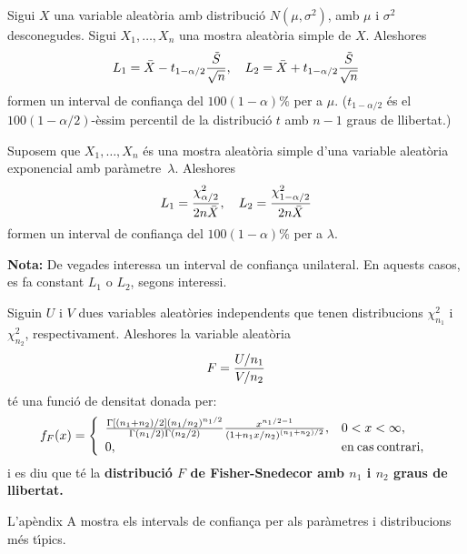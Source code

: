 \begin{proposition}
Sigui $X$ una variable aleat\`oria amb distribuci\'o
$N(\mu,\sigma^2)$, amb $\mu$ i $\sigma^2$ desconegudes. 
Sigui $X_1, \ldots , X_n$ una mostra aleat\`oria simple de $X$. Aleshores
$$L_1 = \bar{X} - t_{1-\alpha/2} {\tilde{S} \over \sqrt{n}}, \quad 
L_2 = \bar{X} +t_{1-\alpha/2} {\tilde{S} \over \sqrt{n}}$$
formen un interval de confian\c ca del $100(1-\alpha)\%$ per a $\mu$.
($t_{1-\alpha/2}$ \'es el $100(1-\alpha/2)$-\`essim percentil de la 
distribuci\'o $t$ amb $n-1$ graus de llibertat.)
\end{proposition}

\begin{proposition}
Suposem que $X_1, \ldots , X_n$ \'es una mostra aleat\`oria simple
d'una variable aleat\`oria exponencial
 amb par\`ametre~$\lambda$.
 Aleshores
$$L_1 = {\chi_{\alpha/2}^2 \over 2n\bar{X}}, \ \ \ L_2 = {\chi_{1-\alpha/2}^2
\over 2n\bar{X}}$$
formen un interval de confian\c ca del $100(1-\alpha)\%$ per a $\lambda$.
\end{proposition}

{\bf Nota:} De vegades interessa un interval de confian\c ca unilateral.
 En aquests
casos, es fa constant $L_1$ o $L_2$, segons interessi.

\begin{proposition}
Siguin $U$ i $V$ dues variables aleat\`ories independents que
tenen distribucions $\chi_{n_1}^2$ i $\chi_{n_2}^2$, respectivament. 
Aleshores la variable aleat\`oria
$$F = {U/n_1 \over V/n_2}$$
t\'e una funci\'o de densitat donada per:
$$f_F(x) = 
\left\{ 
\begin{array}{ll} 
{\Gamma\left[(n_1 + n_2)/2 \right](n_1 /
n_2)^{n_1 / 2} \over \Gamma(n_1 / 2) \Gamma(n_2 / 2)} {x^{n_1 / 2 - 1}\over
\left(1 + n_1 x / n_2 \right)^{(n_1 + n_ 2)/2}}, & 0 < x < \infty,\\ 0, & {\rm en
\> cas \> contrari},
\end{array}
\right.$$
i es diu que t\'e la {\bf distribuci\'o $F$ de Fisher-Snedecor 
amb $n_1$ i $n_2$
graus de llibertat.}
\end{proposition}

L'ap\`endix A mostra els intervals de confian\c ca per als par\`ametres i distribucions
m\'es t\'{\i}pics.

